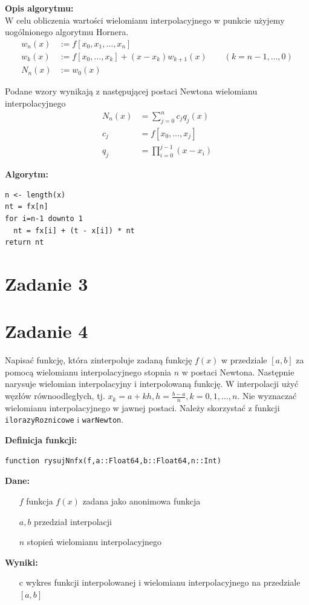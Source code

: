 \documentclass[12pt]{article}
\begin{document}
\noindent \textbf{Opis algorytmu:}\\
W celu obliczenia wartości wielomianu interpolacyjnego w punkcie użyjemy uogólnionego algorytmu Hornera.
\begin{align*}
	w_n(x) &:= f[x_0, x_1, \ldots, x_n] \\
	w_k(x) &:= f[x_0, \ldots, x_k] + (x - x_k)w_{k+1}(x) \qquad (k = n-1, \ldots, 0) \\
	N_n(x) &:= w_0(x)
\end{align*}

\noindent Podane wzory wynikają z następującej postaci Newtona wielomianu interpolacyjnego 
\begin{align*}
N_n(x) &= \sum_{j=0}^n c_jq_j(x) \\
c_j &= f[x_0, \ldots, x_j] \\
q_j &= \prod_{i=0}^{j-1} (x-x_i)
\end{align*}

\noindent \textbf{Algorytm:}
\begin{verbatim}
n <- length(x)
nt = fx[n]
for i=n-1 downto 1
  nt = fx[i] + (t - x[i]) * nt
return nt
\end{verbatim}

\section{Zadanie 3}

\section{Zadanie 4}
Napisać funkcję, która zinterpoluje zadaną funkcję $f(x)$ w przedziale $[a, b]$ za pomocą wielomianu interpolacyjnego stopnia $n$ w postaci Newtona. Następnie narysuje wielomian interpolacyjny i interpolowaną funkcję. W interpolacji użyć węzłów równoodległych, tj. $x_k=a+kh, h=\frac{b-a}{n}, k= 0,1, \ldots , n$. Nie wyznaczać wielomianu interpolacyjnego w jawnej postaci. Należy skorzystać z funkcji \texttt{ilorazyRoznicowe} i \texttt{warNewton}.


\noindent \textbf{Definicja funkcji:}

\begin{verbatim}
function rysujNnfx(f,a::Float64,b::Float64,n::Int)
\end{verbatim}

\noindent \textbf{Dane:}
\begin{itemize}[leftmargin=4.0cm,labelsep=0.4cm]
\item[$f$] funkcja $f(x)$ zadana jako anonimowa funkcja
\item[$a, b$]  przedział interpolacji
\item[$n$] stopień wielomianu interpolacyjnego
\end{itemize}
\textbf{Wyniki:} 
\begin{itemize}[leftmargin=4.0cm,labelsep=0.4cm]
\item[c] wykres funkcji interpolowanej i wielomianu interpolacyjnego na przedziale $[a,b]$
\end{itemize}
\end{document}
